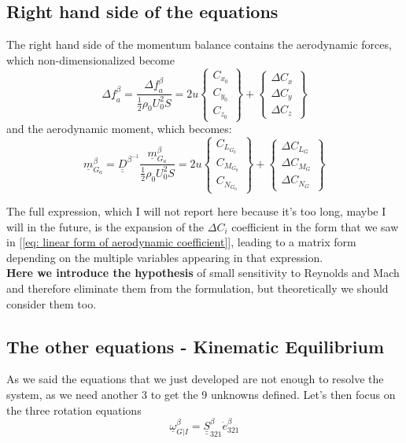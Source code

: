 \subsection{Right hand side of the equations}
The right hand side of the momentum balance contains the aerodynamic forces, which non-dimensionalized become
\begin{equation}
    \Delta \underline{f}_a^\beta = \frac{\Delta \underline{f}_a^\beta}{\frac{1}{2}\rho_0U_0^2S}=2u \begin{Bmatrix}
        C_{x_0}\\
        C_{y_0}\\
        C_{z_0}
    \end{Bmatrix} +
    \begin{Bmatrix}
        \Delta C_x\\
        \Delta C_y\\
        \Delta C_z
    \end{Bmatrix}
\end{equation}
and the aerodynamic moment, which becomes:
\begin{equation}
    \underline{m}_{G_a}^\beta = \underline{\underline{D}}^{\beta^{-1}} \frac{\underline{m}_{G_a}^\beta}{\frac{1}{2}\rho_0U_0^2S} = 2u \begin{Bmatrix}
        C_{L_{G_0}}\\
        C_{M_{G_0}}\\
        C_{N_{G_0}}
    \end{Bmatrix}+
    \begin{Bmatrix}
       \Delta C_{L_{G}}\\
       \Delta C_{M_{G}}\\
       \Delta C_{N_{G}}
    \end{Bmatrix}
\end{equation}

The full expression, which I will not report here because it's too long, maybe I will in the future, is the expansion of the $\Delta C_i$ coefficient in the form that we saw in [\ref{eq: linear form of aerodynamic coefficient}], leading to a matrix form depending on the multiple variables appearing in that expression.
\\
\textbf{Here we introduce the hypothesis} of small sensitivity to Reynolds and Mach and therefore eliminate them from the formulation, but theoretically we should consider them too.

\subsection{The other equations - Kinematic Equilibrium}
As we said the equations that we just developed are not enough to resolve the system, as we need another 3 to get the 9 unknowns defined. Let's then focus on the three rotation equations
\begin{equation}
    \underline{\omega}_{G|I}^\beta = \underline{\underline{S}}_{321}^\beta \dot e_{321}^\beta
\end{equation}

